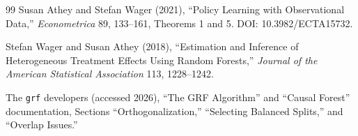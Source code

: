 \documentclass{article}
\begin{document}
\begin{thebibliography}{99}
   Susan Athey and Stefan Wager (2021), ``Policy Learning with Observational Data,'' \emph{Econometrica} 89, 133--161, Theorems 1 and 5. DOI: 10.3982/ECTA15732.

   Stefan Wager and Susan Athey (2018), ``Estimation and Inference of Heterogeneous Treatment Effects Using Random Forests,'' \emph{Journal of the American Statistical Association} 113, 1228--1242.

   The \texttt{grf} developers (accessed 2026), ``The GRF Algorithm'' and ``Causal Forest'' documentation, Sections ``Orthogonalization,'' ``Selecting Balanced Splits,'' and ``Overlap Issues.''

\end{thebibliography}
\end{document}
